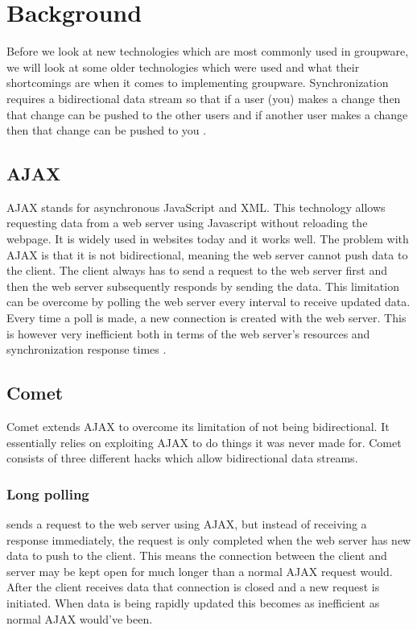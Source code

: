 \documentclass[prodmode,acmtecs]{acmsmall}
\begin{document}
\section{Background}
Before we look at new technologies which are most commonly used in groupware, we will look at some older technologies which were used and what their shortcomings are when it comes to implementing groupware. Synchronization requires a bidirectional data stream so that if a user (you) makes a change then that change can be pushed to the other users and if another user makes a change then that change can be pushed to you \cite{linner2012instant}.

\subsection{AJAX} 
AJAX stands for asynchronous JavaScript and XML. This technology allows requesting data from a web server using Javascript without reloading the webpage. It is widely used in websites today and it works well. The problem with AJAX is that it is not bidirectional, meaning the web server cannot push data to the client. The client always has to send a request to the web server first and then the web server subsequently responds by sending the data. This limitation can be overcome by polling the web server every interval to receive updated data. Every time a poll is made, a new connection is created with the web server. This is however very inefficient both in terms of the web server's resources and synchronization response times \cite{gutwin2011real}. 

\subsection{Comet}
Comet extends AJAX to overcome its limitation of not being bidirectional. It essentially relies on exploiting AJAX to do things it was never made for. Comet consists of three different hacks which allow bidirectional data streams. 
\subsubsection{Long polling} sends a request to the web server using AJAX, but instead of receiving a response immediately, the request is only completed when the web server has new data to push to the client. This means the connection between the client and server may be kept open for much longer than a normal AJAX request would. After the client receives data that connection is closed and a new request is initiated. When data is being rapidly updated this becomes as inefficient as normal AJAX would've been.
\end{document}
